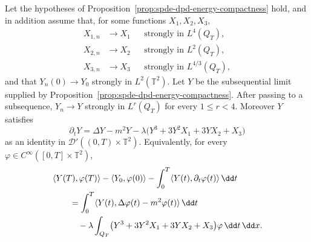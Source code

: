 \begin{proposition}
\label{prop:spde-dpd-distributional-limit}
Let the hypotheses of
Proposition~\ref{prop:spde-dpd-energy-compactness} hold, and in addition
assume that, for some functions \(X_1,X_2,X_3\),
\[
\begin{aligned}
  X_{1,n}&\to X_1
    &&\text{strongly in }L^4(Q_T),\\
  X_{2,n}&\to X_2
    &&\text{strongly in }L^2(Q_T),\\
  X_{3,n}&\to X_3
    &&\text{strongly in }L^{4/3}(Q_T),
\end{aligned}
\]
and that \(Y_n(0)\to Y_0\) strongly in \(L^2(\mathbb T^2)\).  Let \(Y\) be
the subsequential limit supplied by
Proposition~\ref{prop:spde-dpd-energy-compactness}.  After passing to a
subsequence, \(Y_n\to Y\) strongly in \(L^r(Q_T)\) for every
\(1\leq r<4\).  Moreover \(Y\) satisfies
\begin{equation}
  \partial_tY
  =
  \Delta Y-m^2Y
  -\lambda\bigl(Y^3+3Y^2X_1+3YX_2+X_3\bigr)
  \label{eq:spde-dpd-distributional-limit-equation}
\end{equation}
as an identity in \(\mathcal D'((0,T)\times\mathbb T^2)\).  Equivalently,
for every \(\varphi\in C^\infty([0,T]\times\mathbb T^2)\),
\begin{align}
  &\langle Y(T),\varphi(T)\rangle
  -\langle Y_0,\varphi(0)\rangle
  -\int_0^T\langle Y(t),\partial_t\varphi(t)\rangle\,\dd t
  \notag\\
  &\qquad =
  \int_0^T
  \langle Y(t),\Delta\varphi(t)-m^2\varphi(t)\rangle\,\dd t
  \notag\\
  &\qquad\quad
  -\lambda\int_{Q_T}
  \bigl(Y^3+3Y^2X_1+3YX_2+X_3\bigr)\varphi\,\dd t\,\dd x .
  \label{eq:spde-dpd-distributional-limit-weak-form}
\end{align}
\end{proposition}

